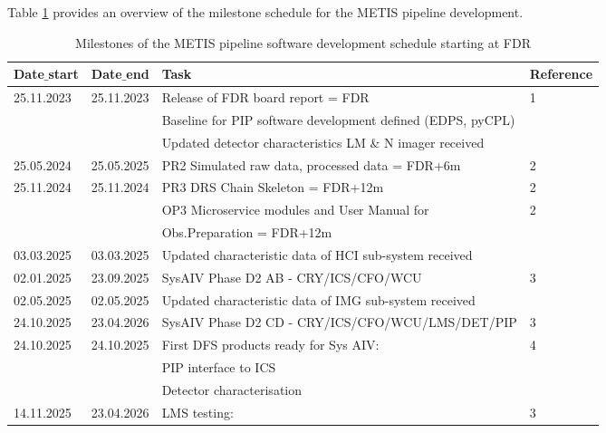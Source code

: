 Table \ref{tab:development_schedule} provides an overview of the milestone schedule for the METIS pipeline development.

\begin{table}
    \caption[Development schedule]{Milestones of the METIS pipeline software development schedule starting at FDR}
  \label{tab:development_schedule}

\centering
\scriptsize
\begin{tabularx}{\textwidth}{llll}

\hline
Date$\_$start &	Date$\_$end   &	Task                            &		Reference \\
\hline\hline
25.11.2023 & 25.11.2023 &	Release of FDR board report = FDR        &	1 \\
	  &		   &	Baseline for PIP software development defined (EDPS, pyCPL) &	\\
    &    	 &    Updated detector characteristics LM \& N imager received    &	\\
\hline
25.05.2024 & 25.05.2025 &	PR2 Simulated raw data, processed data = FDR+6m &	2 \\
\hline
25.11.2024 & 25.11.2024 &	PR3 DRS Chain Skeleton = FDR+12m     &	2 \\
	&		 &	OP3 Microservice modules and User Manual for                &	2 \\
    &        &  Obs.Preparation = FDR+12m                                 &	\\
\hline
03.03.2025 & 03.03.2025 &	Updated characteristic data of HCI sub-system received      & 	\\
\hline
02.01.2025 & 23.09.2025 &	SysAIV Phase D2 AB - CRY/ICS/CFO/WCU          &	3 \\
\hline
02.05.2025 & 02.05.2025 &	Updated characteristic data of IMG sub-system received	    &   \\
\hline
24.10.2025 & 23.04.2026 &	SysAIV Phase D2 CD - CRY/ICS/CFO/WCU/LMS/DET/PIP            &	3 \\
\hline
24.10.2025 & 24.10.2025 &	First DFS products ready for Sys AIV:            &	4 \\
    &               &    PIP interface to ICS                                        &	\\
           &               &    Detector characterisation                                   &	\\
\hline
14.11.2025 &	23.04.2026 &	LMS testing:                                                &	3 \\                       

\end{tabularx}
\end{table}
